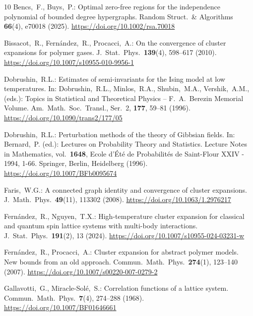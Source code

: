 \documentclass[reqno, 11pt]{amsart}
\theoremstyle{definition}
\begin{document}
\begin{thebibliography}{10}
	 Bencs,~F., Buys,~P.: 
	Optimal zero-free regions for the independence polynomial of bounded degree hypergraphs. 
	Random Struct.\ \& Algorithms \textbf{66}(4), e70018 (2025). 
	\url{https://doi.org/10.1002/rsa.70018}
	
	 Bissacot,~R., Fern{\'a}ndez,~R., Procacci,~A.: 
	On the convergence of cluster expansions for polymer gases. 
	J.\ Stat.\ Phys.\ \textbf{139}(4), 598–617 (2010). 
	\url{https://doi.org/10.1007/s10955-010-9956-1}
		
	 Dobrushin,~R.L.: 
	Estimates of semi-invariants for the Ising model at low temperatures. 
	In: Dobrushin,~R.L., Minlos,~R.A., Shubin,~M.A., Vershik,~A.M., (eds.): 
	Topics in Statistical and Theoretical Physics -- F.\ A.\ Berezin Memorial Volume. 
	Am.\ Math.\ Soc.\ Transl., Ser.\ 2, \textbf{177}, 59–81 (1996). 
	\url{https://doi.org/10.1090/trans2/177/05}
	
	 Dobrushin,~R.L.: 
	Perturbation methods of the theory of Gibbsian fields. 
	In: Bernard,~P. (ed.): 
	Lectures on Probability Theory and Statistics. Lecture Notes in Mathematics, vol.\ \textbf{1648}, Ecole d'{\'E}t{\'e} de Probabilit{\'e}s de Saint-Flour XXIV - 1994, 1-66. 
	Springer, Berlin, Heidelberg (1996). 
	\url{https://doi.org/10.1007/BFb0095674}
	
	 Faris,~W.G.: 
	A connected graph identity and convergence of cluster expansions. 
	J.\ Math.\ Phys.\ \textbf{49}(11), 113302 (2008). 
	\url{https://doi.org/10.1063/1.2976217}
	
	 Fern{\'a}ndez,~R., Nguyen,~T.X.: 
	High-temperature cluster expansion for classical and quantum spin lattice systems with multi-body interactions. 
	J.\ Stat.\ Phys.\ \textbf{191}(2), 13 (2024). 
	\url{https://doi.org/10.1007/s10955-024-03231-w}
	
	 Fern{\'a}ndez,~R., Procacci,~A.: 
	Cluster expansion for abstract polymer models. New bounds from an old approach. 
	Commun.\ Math.\ Phys.\ \textbf{274}(1), 123–140 (2007). 
	\url{https://doi.org/10.1007/s00220-007-0279-2}
	
	 Gallavotti,~G., Miracle-Sol{\'e},~S.: 
	Correlation functions of a lattice system. 
	Commun.\ Math.\ Phys.\ \textbf{7}(4), 274–288 (1968). 
	\url{https://doi.org/10.1007/BF01646661}
	

\end{thebibliography}
\end{document}
